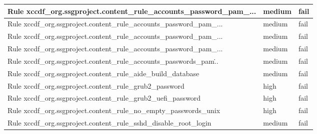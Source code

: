 \begin{longtable}{|p{7cm}|p{2cm}|p{2cm}|}

Rule xccdf\_org.ssgproject.content\_rule\_accounts\_password\_pam\_... & medium & fail \\
\hline
Rule xccdf\_org.ssgproject.content\_rule\_accounts\_password\_pam\_... & medium & fail \\
\hline
Rule xccdf\_org.ssgproject.content\_rule\_accounts\_password\_pam\_... & medium & fail \\
\hline
Rule xccdf\_org.ssgproject.content\_rule\_accounts\_password\_pam\_... & medium & fail \\
\hline
Rule xccdf\_org.ssgproject.content\_rule\_accounts\_passwords\_pam\... & medium & fail \\
\hline
Rule xccdf\_org.ssgproject.content\_rule\_aide\_build\_database & medium & fail \\
\hline
Rule xccdf\_org.ssgproject.content\_rule\_grub2\_password & high & fail \\
\hline
Rule xccdf\_org.ssgproject.content\_rule\_grub2\_uefi\_password & high & fail \\
\hline
Rule xccdf\_org.ssgproject.content\_rule\_no\_empty\_passwords\_unix & high & fail \\
\hline
Rule xccdf\_org.ssgproject.content\_rule\_sshd\_disable\_root\_login & medium & fail \\
\hline

\end{longtable}

